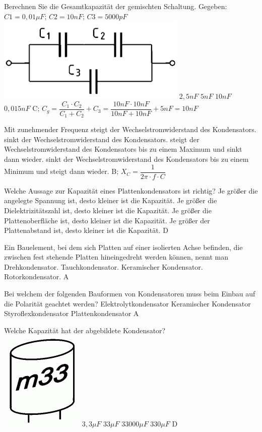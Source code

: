 {
Berechnen Sie die Gesamtkapazität der gemischten Schaltung. Gegeben: $C1 = 0,01 \mu F$; $C2 = 10 nF$; $C3 = 5000 pF$\\
\includegraphics[scale=0.3]{TD107.png}
}%
{$2,5 nF$}%
{$5 nF$}%
{$10 nF$}%
{$0,015 nF$}%
{C; $C_g = \dfrac{C_1 \cdot C_2}{C_1 + C_2} + C_3 = \dfrac{10nF \cdot 10nF}{10nF + 10nF} + 5nF = 10nF$}%

{Mit zunehmender Frequenz}%
{steigt der Wechselstromwiderstand des Kondensators.}%
{sinkt der Wechselstromwiderstand des Kondensators.}%
{steigt der Wechselstromwiderstand des Kondensators bis zu einem Maximum und sinkt dann wieder.}%
{sinkt der Wechselstromwiderstand des Kondensators bis zu einem Minimum und steigt dann wieder.}%
{B; $X_C = \dfrac{1}{2\pi \cdot f \cdot C}$}%


{Welche Aussage zur Kapazität eines Plattenkondensators ist richtig?}%
{Je größer die angelegte Spannung ist, desto kleiner ist die Kapazität.}%
{Je größer die Dielektrizitätszahl ist, desto kleiner ist die Kapazität.}%
{Je größer die Plattenoberfläche ist, desto kleiner ist die Kapazität.}%
{Je größer der Plattenabstand ist, desto kleiner ist die Kapazität.}%
{D}%

{Ein Bauelement, bei dem sich Platten auf einer isolierten Achse befinden, die zwischen fest stehende Platten hineingedreht werden können, nennt man}%
{Drehkondensator.}%
{Tauchkondensator.}%
{Keramischer Kondensator.}%
{Rotorkondensator.}%
{A}%

{Bei welchem der folgenden Bauformen von
Kondensatoren muss beim Einbau auf die
Polarität geachtet werden?}%
{Elektrolytkondensator}%
{Keramischer Kondensator}%
{Styroflexkondensator}%
{Plattenkondensator}%
{A}%

{Welche Kapazität hat der abgebildete Kondensator?\\
\includegraphics[scale=0.3]{TC203.png}
}%
{$3,3\mu F$}%
{$33\mu F$}%
{$33000\mu F$}%
{$330\mu F$}%
{D}%

